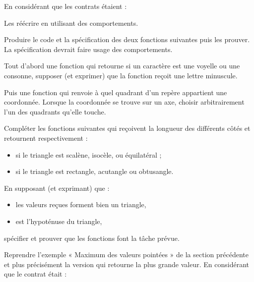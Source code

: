 En considérant que les contrats étaient :




Les réécrire en utilisant des comportements.






Produire le code et la spécification des deux fonctions suivantes puis
les prouver. La spécification devrait faire usage des comportements.


Tout d'abord une fonction qui retourne si un caractère est une voyelle
ou une consonne, supposer (et exprimer) que la fonction reçoit une
lettre minuscule.




Puis une fonction qui renvoie à quel quadrant d'un repère appartient
une coordonnée. Lorsque la coordonnée se trouve sur un axe, choisir
arbitrairement l'un des quadrants qu'elle touche.








Compléter les fonctions suivantes qui reçoivent la longueur des différents
côtés et retournent respectivement :
\begin{itemize}
\item si le triangle est scalène, isocèle, ou équilatéral ;
\item si le triangle est rectangle, acutangle ou obtusangle.
\end{itemize}




En supposant (et exprimant) que :


\begin{itemize}
\item les valeurs reçues forment bien un triangle,
\item {} est l'hypoténuse du triangle,
\end{itemize}


spécifier et prouver que les fonctions font la tâche prévue.






Reprendre l'exemple « Maximum des valeurs pointées » de la section
précédente et plus précisément la version qui retourne la plus grande
valeur. En considérant que le contrat était :


